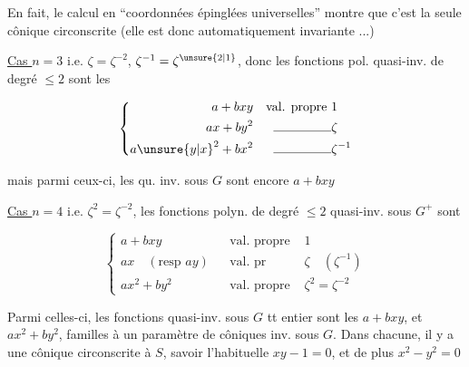 
En fait, le calcul en ``coordonnées épinglées universelles'' montre que c'est la seule cônique circonscrite (elle est donc automatiquement invariante ...)

\uline{Cas $n=3$} i.e. $\zeta=\zeta^{-2}$, $\zeta^{-1}=\zeta^{\unsure{2|1}}$, donc les fonctions pol. quasi-inv.  de degré $\leq2$ sont les

\[\left\{\begin{aligned}
a+bxy&&\text{val. propre }&1\\
ax+by^2&&\rule{1.6cm}{.35pt}&\zeta\\
a{\unsure{y|x}}^2+bx^2&&\rule{1.6cm}{.35pt}&\zeta^{-1}
\end{aligned}\right.\]

mais parmi ceux-ci, les qu. inv. sous $G$ sont encore $a+bxy$

\uline{Cas $n=4$} i.e. $\zeta^2=\zeta^{-2}$, les fonctions polyn. de degré $\leq2$ quasi-inv. sous $G^+$  sont

\[\left\{\begin{aligned}
a+bxy&&\text{val. propre }&1\\
ax\quad(\text{resp }ay)&&\text{val. pr }&\zeta\quad(\zeta^{-1})\\
ax^2+by^2&&\text{val. propre }&\zeta^2=\zeta^{-2}
\end{aligned}\right.\]

Parmi celles-ci, les fonctions quasi-inv. sous $G$ tt entier sont les $a+bxy$, et  $ax^2+by^2$,  familles à un paramètre de côniques inv. sous $G$. Dans chacune, il y a  une cônique circonscrite à $S$, savoir l'habituelle $xy-1=0$, et de plus $x^2-y^2=0$

